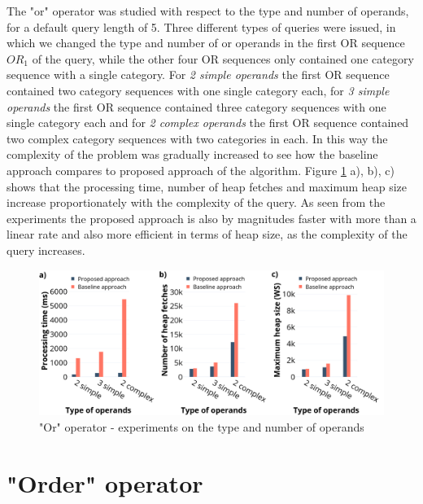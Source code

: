 The "or" operator was studied with respect to the type and number of operands, for a default query length of 5. Three different types of queries were issued, in which we changed the type and number of or operands in the first OR sequence $OR_1$ of the query, while the other four OR sequences only contained one category sequence with a single category. For \textit{2 simple operands} the first OR sequence contained two category sequences with one single category each, for \textit{3 simple operands} the first OR sequence contained three category sequences with one single category each and for \textit{2 complex operands} the first OR sequence contained two complex category sequences with two categories in each. In this way the complexity of the problem was gradually increased to see how the baseline approach compares to proposed approach of the algorithm.  
Figure \ref{fig:or} a), b), c) shows that the processing time, number of heap fetches and maximum heap size increase proportionately with the complexity of the query. As seen from the experiments the proposed approach is also by magnitudes faster with more than a linear rate and also more efficient in terms of heap size, as the complexity of the query increases. 

\begin{figure}[H]
	\includegraphics[scale=0.29]{images/or_30.png}
	\centering
	\caption{"Or" operator - experiments on the type and number of operands}
	\label{fig:or}
\end{figure}


\section{"Order" operator}
\label{sec:experimentsOrder}

